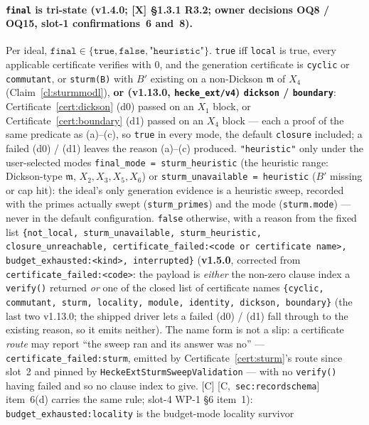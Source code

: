 \documentclass[11pt]{article}
\theoremstyle{remark}
\newcommand{\m}{\mathfrak{m}}
\newcommand{\HA}[1]{[C,~\texttt{#1}]}      %
\begin{document}
\paragraph{\texttt{final} is tri-state (v1.4.0; [X] \S1.3.1 R3.2; owner decisions OQ8 /
OQ15, slot-1 confirmations~6 and~8).} Per ideal,
$\texttt{final}\in\{\texttt{true},\texttt{false},\texttt{"heuristic"}\}$. \texttt{true} iff
\texttt{local} is true, every applicable certificate verifies with $0$, and the generation
certificate is \texttt{cyclic} or \texttt{commutant}, or \texttt{sturm(B\textquotesingle)} with
$B'$ existing on a non-Dickson $\m$ of $X_4$ (Claim~\ref{cl:sturmmodl}), \textbf{or (v1.13.0,
\texttt{hecke\_ext/v4}) \texttt{dickson} / \texttt{boundary}}: Certificate~\ref{cert:dickson} (d0) passed on an
$X_1$ block, or Certificate~\ref{cert:boundary} (d1) passed on an $X_4$ block --- each a proof of the same
predicate as (a)--(c), so \texttt{true} in every mode, the default \texttt{closure} included; a failed (d0)
/ (d1) leaves the reason (a)--(c) produced. \texttt{"heuristic"}
only under the user-selected modes \texttt{final\_mode = sturm\_heuristic} (the heuristic range:
Dickson-type $\m$, $X_2,X_3,X_5,X_6$) or \texttt{sturm\_unavailable = heuristic} ($B'$ missing or
cap hit): the ideal's only generation evidence is a heuristic sweep, recorded with the primes
actually swept (\texttt{sturm\_primes}) and the mode (\texttt{sturm.mode}) --- never in the
default configuration. \texttt{false} otherwise, with a reason from the fixed list
\texttt{\{not\_local, sturm\_unavailable, sturm\_heuristic, closure\_unreachable,
certificate\_failed:<code or certificate name>, budget\_exhausted:<kind>, interrupted\}}
(\textbf{v1.5.0}, corrected from \texttt{certificate\_failed:<code>}: the payload is
\emph{either} the non-zero clause index a \texttt{verify()} returned \emph{or} one of the
closed list of certificate names \texttt{\{cyclic, commutant, sturm, locality, module,
identity, dickson, boundary\}} (the last two v1.13.0; the shipped driver lets a failed (d0) / (d1) fall
through to the existing reason, so it emits neither). The name form is not a slip: a certificate \emph{route} may report ``the
sweep ran and its answer was no'' --- \texttt{certificate\_failed:sturm}, emitted by
Certificate~\ref{cert:sturm}'s route since slot~2 and pinned by
\texttt{HeckeExtSturmSweepValidation} --- with no \texttt{verify()} having failed and so
no clause index to give. [C] \HA{sec:recordschema} item~6(d) carries the same rule; slot-4
WP-1 \S6 item~1):
\texttt{budget\_exhausted:locality} is the budget-mode locality survivor
\end{document}
